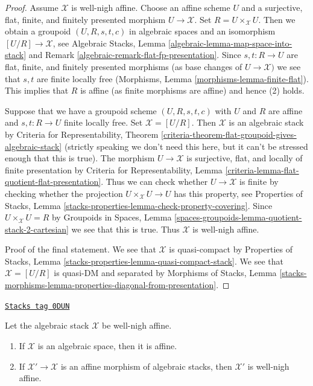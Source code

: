 \begin{proof}
Assume $\mathcal{X}$ is well-nigh affine. Choose an affine scheme $U$
and a surjective, flat, finite, and finitely presented morphism
$U \to \mathcal{X}$. Set $R = U \times_\mathcal{X} U$. Then we
obtain a groupoid $(U, R, s, t, c)$ in algebraic spaces and an
isomorphism $[U/R] \to \mathcal{X}$, see
Algebraic Stacks, Lemma \ref{algebraic-lemma-map-space-into-stack}
and Remark \ref{algebraic-remark-flat-fp-presentation}.
Since $s, t : R \to U$ are
flat, finite, and finitely presented morphisms
(as base changes of $U \to \mathcal{X})$ we see that
$s, t$ are finite locally free
(Morphisms, Lemma \ref{morphisms-lemma-finite-flat}).
This implies that $R$ is affine (as finite morphisms are affine)
and hence (2) holds.

\medskip\noindent
Suppose that we have a groupoid scheme $(U, R, s, t, c)$ with $U$ and
$R$ are affine and $s, t : R \to U$ finite locally free.
Set $\mathcal{X} = [U/R]$. Then $\mathcal{X}$ is an algebraic stack
by Criteria for Representability, Theorem
\ref{criteria-theorem-flat-groupoid-gives-algebraic-stack} (strictly speaking
we don't need this here, but it can't be stressed enough that this is true).
The morphism $U \to \mathcal{X}$ is surjective, flat, and locally
of finite presentation by
Criteria for Representability, Lemma
\ref{criteria-lemma-flat-quotient-flat-presentation}.
Thus we can check whether $U \to \mathcal{X}$ is finite by
checking whether the projection $U \times_\mathcal{X} U \to U$
has this property, see Properties of Stacks, Lemma
\ref{stacks-properties-lemma-check-property-covering}.
Since $U \times_\mathcal{X} U = R$ by
Groupoids in Spaces, Lemma
\ref{spaces-groupoids-lemma-quotient-stack-2-cartesian}
we see that this is true. Thus $\mathcal{X}$ is well-nigh affine.

\medskip\noindent
Proof of the final statement. We see that $\mathcal{X}$
is quasi-compact by Properties of Stacks, Lemma
\ref{stacks-properties-lemma-quasi-compact-stack}.
We see that $\mathcal{X} = [U/R]$ is quasi-DM and separated by
Morphisms of Stacks, Lemma
\ref{stacks-morphisms-lemma-properties-diagonal-from-presentation}.
\end{proof}

\begin{lemma}
\label{stacks-more-morphisms-lemma-affine-over-well-nigh-affine}
\href{https://stacks.math.columbia.edu/tag/0DUN}{\texttt{Stacks tag 0DUN}}

Let the algebraic stack $\mathcal{X}$ be well-nigh affine.
\begin{enumerate}
\item If $\mathcal{X}$ is an algebraic space, then it is affine.
\item If $\mathcal{X}' \to \mathcal{X}$ is an affine morphism
of algebraic stacks, then $\mathcal{X}'$ is well-nigh affine.
\end{enumerate}
\end{lemma}

